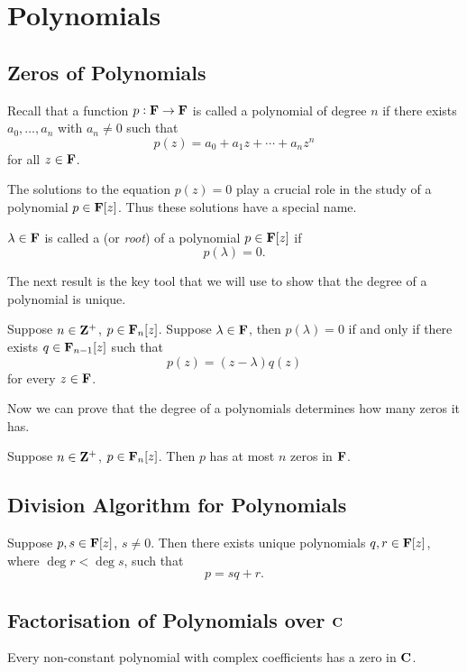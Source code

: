 \chapter{Polynomials}
\section{Zeros of Polynomials}
Recall that a function $p:\mathbf F\to\mathbf F$ is called a polynomial of degree $n$ if there exists $a_0,\dots,a_n$ with $a_n\neq0$ such that
\[p(z)=a_0+a_1z+\cdots+a_nz^n\]
for all $z\in\mathbf F$.

The solutions to the equation $p(z)=0$ play a crucial role in the study of a polynomial $p\in\mathbf F[z]$. Thus these solutions have a special name.

\begin{definition}
$\lambda\in\mathbf F$ is called a  (or \emph{root}) of a polynomial $p\in\mathbf F[z]$ if
\[p(\lambda)=0.\]
\end{definition}

The next result is the key tool that we will use to show that the degree of a polynomial is unique.

\begin{lemma}
Suppose $n\in\mathbf Z^+$, $p\in\mathbf F_n[z]$. Suppose $\lambda\in\mathbf F$, then $p(\lambda)=0$ if and only if there exists $q\in\mathbf F_{n-1}[z]$ such that
\[p(z)=(z-\lambda)q(z)\]
for every $z\in\mathbf F$.
\end{lemma}

Now we can prove that the degree of a polynomials determines how many zeros it has.

\begin{proposition}
Suppose $n\in\mathbf Z^+$, $p\in\mathbf F_n[z]$. Then $p$ has at most $n$ zeros in $\mathbf F$.
\end{proposition}

\section{Division Algorithm for Polynomials}
\begin{proposition}
Suppose $p,s\in\mathbf F[z]$, $s\neq0$. Then there exists unique polynomials $q,r\in\mathbf F[z]$, where $\deg r<\deg s$, such that
\[p=sq+r.\]
\end{proposition}

\section{Factorisation of Polynomials over $\mathbf C$}
\begin{theorem}
Every non-constant polynomial with complex coefficients has a zero in $\mathbf C$.
\end{theorem}


